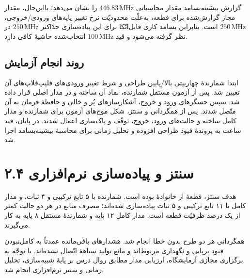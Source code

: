 \documentclass[12pt,a4paper]{article}
\begin{document}
	گزارش بیشینه‌بسامد مقدار محاسباتی \(446.83\,\mathrm{MHz}\) را نشان می‌دهد؛ بااین‌حال، مقدار مجاز گزارش‌شده برای قطعه، به‌علّت محدودیّت نرخ تغییر پایه‌های ورودی/خروجی، \(250\,\mathrm{MHz}\) است. بنابراین بسامد کاری قابل‌اتّکا برای این پیاده‌سازی حدّاکثر \(250\,\mathrm{MHz}\) در نظر گرفته می‌شود و قید \(100\,\mathrm{MHz}\) انتخاب‌شده حاشیهٔ کافی دارد.


	\subsection*{روند انجام آزمایش}
	ابتدا شمارندهٔ چهاربیتی بالا/پایین طراحی و شرط تغییر ورودی‌های فلیپ‌فلاپ‌های آن تعیین شد. پس از آزمون مستقل شمارنده، نماد آن ساخته و در مدار اصلی قرار داده شد. سپس حسگرهای ورود و خروج، آشکارسازهای پُر و خالی و حافظهٔ فرمان  به آن متّصل شدند. پس از همگردانی و سنتز، شکل موج‌های آزمون برای شمارنده و مدار کامل ساخته و حالت‌های ورود، خروج، توقّف و پاک‌سازی اعمال شدند. در پایان، قید ساعت به پروندهٔ قیود طراحی افزوده و تحلیل زمانی برای محاسبهٔ بیشینه‌بسامد اجرا شد.

	\section*{۲.۴ سنتز و پیاده‌سازی نرم‌افزاری}
	هدف سنتز، قطعهٔ  از خانوادهٔ  بوده است. شمارنده با ۵ تابع ترکیبی و ۴ ثبات، و مدار کامل با ۱۱ تابع ترکیبی و ۵ ثبات پیاده‌سازی شده‌اند؛ مصرف منابع در هر دو حالت کمتر از یک درصد ظرفیّت قطعه است. مدار کامل ۱۲ پایه و شمارندهٔ مستقل ۸ پایه به کار می‌گیرند.


	همگردانی هر دو طرح بدون خطا انجام شد. هشدارهای باقی‌مانده عمدتاً به کامل‌نبودن قیود برپایی و نگهداری مربوط‌اند و مانع تولید سیاههٔ اتّصال نشده‌اند. با توجّه به برگزاری مجازی آزمایشگاه، ارزیابی مدار مطابق روال درس بر پایهٔ شبیه‌سازی، تحلیل زمانی و سنتز نرم‌افزاری انجام شد.

\end{document}

